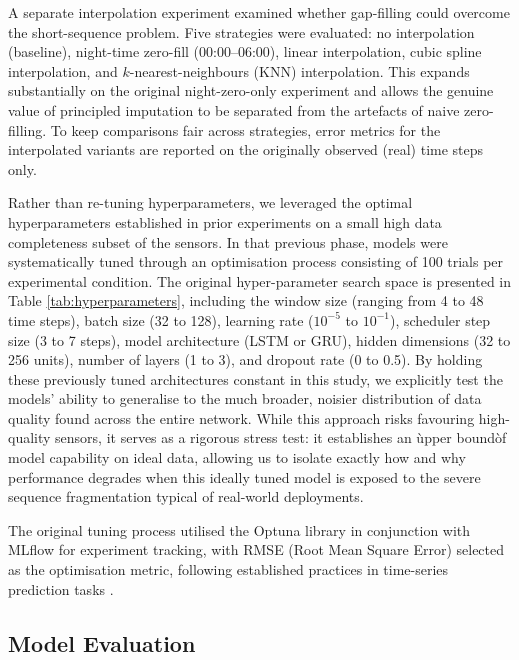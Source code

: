\documentclass[journal,sensors,submit,pdftex,moreauthors]{Definitions/mdpi}
\begin{document}
A separate interpolation experiment examined whether gap-filling could overcome the short-sequence problem. Five strategies were evaluated: no interpolation (baseline), night-time zero-fill (00:00--06:00), linear interpolation, cubic spline interpolation, and $k$-nearest-neighbours (KNN) interpolation. This expands substantially on the original night-zero-only experiment and allows the genuine value of principled imputation to be separated from the artefacts of naive zero-filling. To keep comparisons fair across strategies, error metrics for the interpolated variants are reported on the originally observed (real) time steps only.

Rather than re-tuning hyperparameters, we leveraged the optimal hyperparameters established in prior experiments on a small high data completeness subset of the sensors. In that previous phase, models were systematically tuned through an optimisation process consisting of 100 trials per experimental condition. The original hyper-parameter search space is presented in Table \ref{tab:hyperparameters}, including the window size (ranging from 4 to 48 time steps), batch size (32 to 128), learning rate ($10^{-5}$ to $10^{-1}$), scheduler step size (3 to 7 steps), model architecture (LSTM or GRU), hidden dimensions (32 to 256 units), number of layers (1 to 3), and dropout rate (0 to 0.5). By holding these previously tuned architectures constant in this study, we explicitly test the models' ability to generalise to the much broader, noisier distribution of data quality found across the entire network. While this approach risks favouring high-quality sensors, it serves as a rigorous stress test: it establishes an \`upper bound\` of model capability on ideal data, allowing us to isolate exactly how and why performance degrades when this ideally tuned model is exposed to the severe sequence fragmentation typical of real-world deployments.

The original tuning process utilised the Optuna library \citep{akibaOptunaNextgenerationHyperparameter2019} in conjunction with MLflow \citep{zahariaAcceleratingMachineLearning} for experiment tracking, with RMSE (Root Mean Square Error) selected as the optimisation metric, following established practices in time-series prediction tasks \citep{hyndmanAnotherLookMeasures2006}.

\subsection{Model Evaluation}
\end{document}
